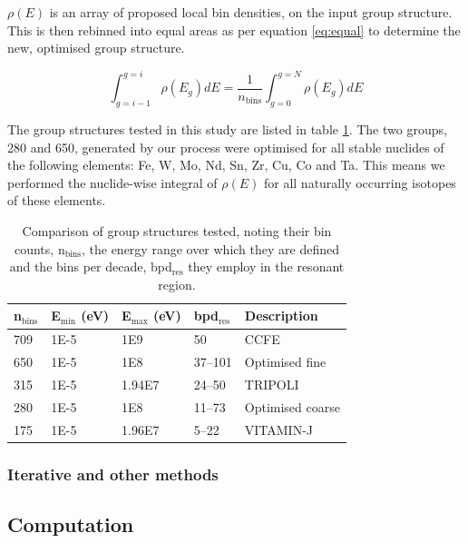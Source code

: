 $\rho(E)$ is an array of proposed local bin densities, on the input group structure. This is then rebinned into equal areas as per equation \ref{eq:equal} to determine the new, optimised group structure.

\begin{equation}
\label{eq:equal}
\int_{g=i-1}^{g=i} \rho(E_{g})dE = \frac{1}{n_\mathrm{bins}}\int_{g=0}^{g=N}\rho(E_{g})dE \end{equation} 

The group structures tested in this study are listed in table \ref{tab:groups}. The two groups, 280 and 650, generated by our process were optimised for all stable nuclides of the following elements: Fe, W, Mo, Nd, Sn, Zr, Cu, Co and Ta. This means we performed the nuclide-wise integral of $\rho(E)$ for all naturally occurring isotopes of these elements. 

\begin{table}[H]
  \centering
  \begin{tabular}{lllll}
    \toprule
    n$_\mathrm{bins}$ & E$_\mathrm{min}$ (eV) & E$_\mathrm{max}$ (eV) & bpd$_\mathrm{res}$ & Description \\ 
    \midrule
    709 & 1E-5 & 1E9 & 50 & CCFE \\
    650 & 1E-5 & 1E8 & 37--101 & Optimised fine \\
    315 & 1E-5 & 1.94E7 & 24--50 & TRIPOLI  \\
    280 & 1E-5 & 1E8 & 11--73 & Optimised coarse \\ 
    175 & 1E-5 & 1.96E7 & 5--22 & VITAMIN-J \\
    \bottomrule
  \end{tabular}
  \caption{Comparison of group structures tested, noting their bin counts, n$_\mathrm{bins}$, the energy range over which they are defined and the bins per decade, bpd$_\mathrm{res}$ they employ in the resonant region.}
  \label{tab:groups}
\end{table}

\subsubsection{Iterative and other methods}

\subsection{Computation}
\label{subsec:computation}

